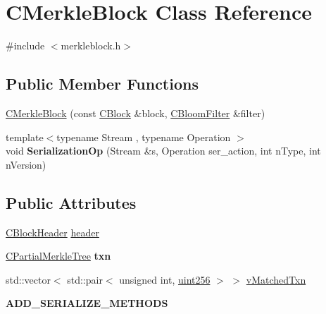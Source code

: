 \hypertarget{class_c_merkle_block}{}\section{C\+Merkle\+Block Class Reference}
\label{class_c_merkle_block}


{\ttfamily \#include $<$merkleblock.\+h$>$}

\subsection*{Public Member Functions}
\begin{DoxyCompactItemize}
\item 
\mbox{\hyperlink{class_c_merkle_block_a5d08ce7034216ca25b0f9eab6bf8c389}{C\+Merkle\+Block}} (const \mbox{\hyperlink{class_c_block}{C\+Block}} \&block, \mbox{\hyperlink{class_c_bloom_filter}{C\+Bloom\+Filter}} \&filter)
\item 
\mbox{\label{class_c_merkle_block_ab803bbe1d359d6b377adf75dc526da92}} 
{\footnotesize template$<$typename Stream , typename Operation $>$ }\\void {\bfseries Serialization\+Op} (Stream \&s, Operation ser\+\_\+action, int n\+Type, int n\+Version)
\end{DoxyCompactItemize}
\subsection*{Public Attributes}
\begin{DoxyCompactItemize}
\item 
\mbox{\hyperlink{class_c_block_header}{C\+Block\+Header}} \mbox{\hyperlink{class_c_merkle_block_a3c1fcef77eee1b476b3f3fd52055748a}{header}}
\item 
\mbox{\label{class_c_merkle_block_ac2174e9e8ea6e429328deb5a69a05558}} 
\mbox{\hyperlink{class_c_partial_merkle_tree}{C\+Partial\+Merkle\+Tree}} {\bfseries txn}
\item 
std\+::vector$<$ std\+::pair$<$ unsigned int, \mbox{\hyperlink{classuint256}{uint256}} $>$ $>$ \mbox{\hyperlink{class_c_merkle_block_a73bbbdcb5d83588b15461c02d0228999}{v\+Matched\+Txn}}
\item 
\mbox{\label{class_c_merkle_block_aa57b1f8bfa7d3adb65dc71e479889194}} 
{\bfseries A\+D\+D\+\_\+\+S\+E\+R\+I\+A\+L\+I\+Z\+E\+\_\+\+M\+E\+T\+H\+O\+DS}
\end{DoxyCompactItemize}


